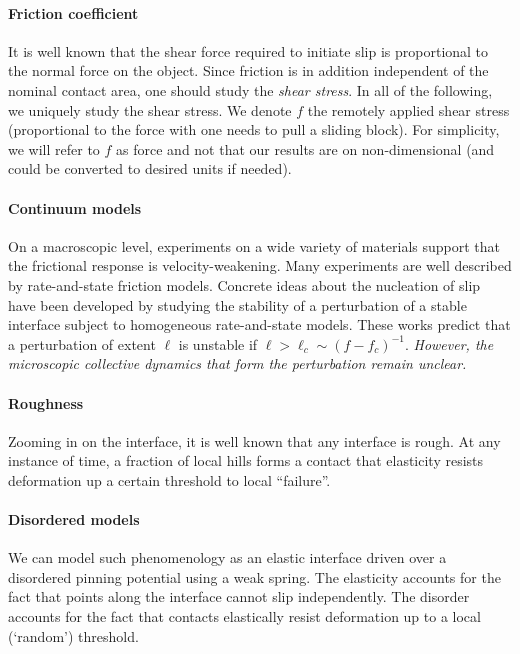 \documentclass{goose-article}
\begin{document}
\paragraph{Friction coefficient}

It is well known that the shear force required to initiate slip is proportional to the normal force on the object.
Since friction is in addition independent of the nominal contact area, one should study the \emph{shear stress}.
In all of the following, we uniquely study the shear stress.
We denote $f$ the remotely applied shear stress (proportional to the force with one needs to pull a sliding block).
For simplicity, we will refer to $f$ as force and not that our results are on non-dimensional (and could be converted to desired units if needed).

\paragraph{Continuum models}

On a macroscopic level, experiments on a wide variety of materials support that the frictional response is velocity-weakening.
Many experiments are well described by rate-and-state friction models.
Concrete ideas about the nucleation of slip have been developed by studying the stability of a perturbation of a stable interface subject to homogeneous rate-and-state models.
These works predict that a perturbation of extent $\ell$ is unstable if $\ell > \ell_c \sim (f - f_c)^{-1}$.
\emph{However, the microscopic collective dynamics that form the perturbation remain unclear.}

\paragraph{Roughness}

Zooming in on the interface, it is well known that any interface is rough.
At any instance of time, a fraction of local hills forms a contact that elasticity resists deformation up a certain threshold to local ``failure''.

\paragraph{Disordered models}

We can model such phenomenology as an elastic interface driven over a disordered pinning potential using a weak spring.
The elasticity accounts for the fact that points along the interface cannot slip independently.
The disorder accounts for the fact that contacts elastically resist deformation up to a local (`random') threshold.
\end{document}
